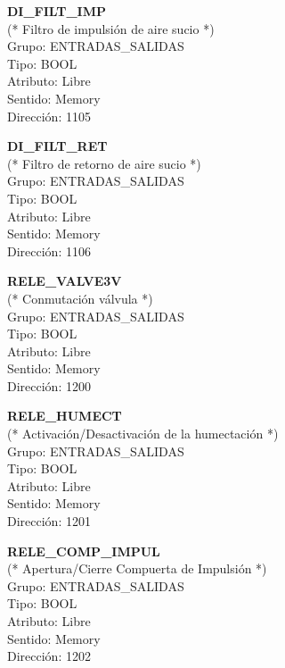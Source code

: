\vspace{10mm}

\textbf{DI\_FILT\_IMP}\\(* Filtro de impulsión de aire sucio *)\\Grupo: ENTRADAS\_SALIDAS\\Tipo: BOOL\\Atributo: Libre\\Sentido: Memory\\Dirección: 1105

\vspace{10mm}

\textbf{DI\_FILT\_RET}\\(* Filtro de retorno de aire sucio *)\\Grupo: ENTRADAS\_SALIDAS\\Tipo: BOOL\\Atributo: Libre\\Sentido: Memory\\Dirección: 1106

\vspace{10mm}

\textbf{RELE\_VALVE3V}\\(* Conmutación válvula *)\\Grupo: ENTRADAS\_SALIDAS\\Tipo: BOOL\\Atributo: Libre\\Sentido: Memory\\Dirección: 1200

\vspace{10mm}

\textbf{RELE\_HUMECT}\\(* Activación/Desactivación de la humectación *)\\Grupo: ENTRADAS\_SALIDAS\\Tipo: BOOL\\Atributo: Libre\\Sentido: Memory\\ Dirección: 1201

\vspace{10mm}

\textbf{RELE\_COMP\_IMPUL}\\(* Apertura/Cierre Compuerta de Impulsión *)\\Grupo: ENTRADAS\_SALIDAS\\Tipo: BOOL\\Atributo: Libre\\Sentido: Memory\\Dirección: 1202

